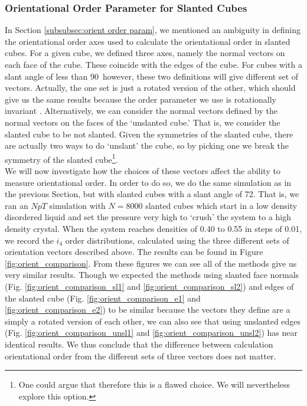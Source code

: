 \documentclass[thesis]{subfiles}
\begin{document}
\newpage

\subsubsection{Orientational Order Parameter for Slanted Cubes}\label{subsec:orientation vectors}

In Section \ref{subsubsec:orient order param}, we mentioned an ambiguity in defining the orientational order axes used to calculate the orientational order in slanted cubes. For a given cube, we defined three axes, namely the normal vectors on each face of the cube. These coincide with the edges of the cube. For cubes with a slant angle of less than 90\degr\ however, these two definitions will give different set of vectors. Actually, the one set is just a rotated version of the other, which should give us the same results because the order parameter we use is rotationally invariant \cite{steinhardt1983bond}. Alternatively, we can consider the normal vectors defined by the normal vectors on the faces of the `unslanted cube.' That is, we consider the slanted cube to be not slanted. Given the symmetries of the slanted cube, there are actually two ways to do `unslant' the cube, so by picking one we break the symmetry of the slanted cube\footnote{One could argue that therefore this is a flawed choice. We will nevertheless explore this option.}. \\
We will now investigate how the choices of these vectors affect the ability to measure orientational order. In order to do so, we do the same simulation as in the previous Section, but with slanted cubes with a slant angle of 72\degr. That is, we ran an $NpT$ simulation with $N = 8000$ slanted cubes which start in a low density disordered liquid and set the pressure very high to `crush' the system to a high density crystal. When the system reaches densities of 0.40 to 0.55 in steps of 0.01, we record the $i_4$ order distributions, calculated using the three different sets of orientation vectors described above. The results can be found in Figure \ref{fig:orient_comparison}.
From these figures we can see all of the methods give us very similar results. Though we expected the methods using slanted face normals (Fig. \ref{fig:orient_comparison_sl1} and \ref{fig:orient_comparison_sl2}) and edges of the slanted cube (Fig. \ref{fig:orient_comparison_e1} and \ref{fig:orient_comparison_e2}) to be similar because the vectors they define are a simply a rotated version of each other, we can also see that using unslanted edges (Fig. \ref{fig:orient_comparison_unsl1} and \ref{fig:orient_comparison_unsl2}) has near identical results. We thus conclude that the difference between calculation orientational order from the different sets of three vectors does not matter.
\end{document}
